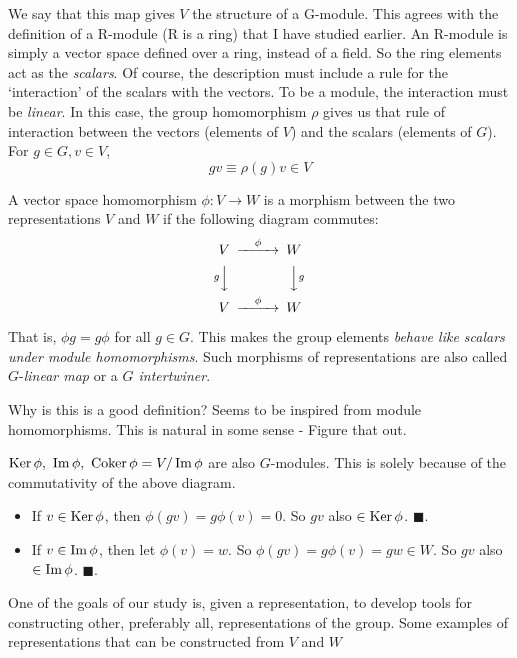\begin{insight}
We say that this map gives $V$ the structure of a G-module. This agrees with the  definition of a R-module (R is a ring) that I have studied earlier. An R-module is simply a vector space defined over a ring, instead of a field. So the ring elements act as the \emph{scalars}. Of course, the description must include a rule for the `interaction' of the scalars with the vectors. To be a module, the interaction must be \emph{linear}.  
In this case, the group homomorphism $\rho$ gives us that rule of interaction between the vectors (elements of $V$) and the scalars (elements of $G$). For $g\in G, v \in V$, $$gv\equiv\rho(g)v \in V$$
\end{insight}


A vector space homomorphism $\phi: V\to W$ is a morphism between the two representations $V$ and $W$ if the following diagram commutes:
\begin{equation} \begin{CD}
  V @>\phi>> W\\
  @VgVV @VVgV\\
  V @>\phi>> W\\
\end{CD} \end{equation}

That is, $\phi g=g\phi$ for all $g\in G$. This makes the group elements \emph{behave like scalars under module homomorphisms}. Such morphisms of representations are also called $G$-\emph{linear map} or a \emph{$G$ intertwiner}.

\begin{insight}
   Why is this is a good definition? Seems to be inspired from module homomorphisms. This is natural in some sense - Figure that out.
\end{insight}

$\operatorname{Ker} \phi,\ \operatorname{Im} \phi,\ \operatorname{Coker} \phi = V/\operatorname{Im}\phi$ are also $G$-modules. This is solely because of the commutativity of the above diagram.
\begin{itemize}
    \item If $v\in \operatorname{Ker} \phi$, then $\phi(gv) = g\phi(v) = 0$. So $gv$ also $\in \operatorname{Ker} \phi$. $\blacksquare$.
    \item If $v\in \operatorname{Im} \phi$, then let $\phi(v) = w$. So $\phi(gv)=g\phi(v)=gw \in W$. So $gv$ also $\in \operatorname{Im} \phi$. $\blacksquare$.
\end{itemize}

One of the goals of our study is, given a representation, to develop tools for constructing other, preferably all, representations of the group. 
Some examples of representations that can be constructed from $V$ and $W$

